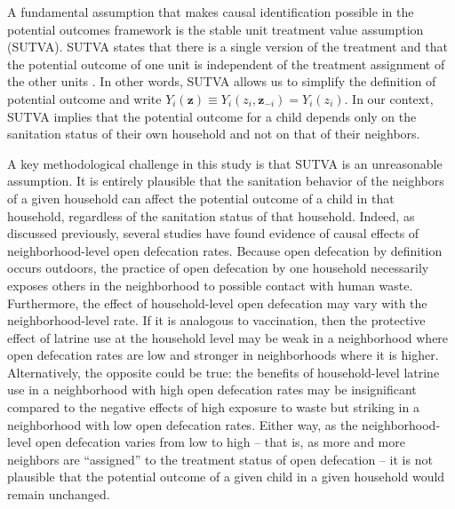 \documentclass[11pt,a4paper]{article}
\begin{document}
A fundamental assumption that makes causal identification possible in the potential outcomes framework is the stable unit treatment value assumption (SUTVA). SUTVA states that there is a single version of the treatment and that the potential outcome of one unit is independent of the treatment assignment of the other units \citep{rubin1986}. In other words, SUTVA allows us to simplify the definition of potential outcome and write $Y_i(\mathbf{z}) \equiv Y_i(z_i, \mathbf{z}_{-i}) = Y_i(z_i)$. In our context, SUTVA implies that the potential outcome for a child depends only on the sanitation status of their own household and not on that of their neighbors.

A key methodological challenge in this study is that SUTVA is an unreasonable assumption. It is entirely plausible that the sanitation behavior of the neighbors of a given household can affect the potential outcome of a child in that household, regardless of the sanitation status of that household. Indeed, as discussed previously, several studies have found evidence of causal effects of neighborhood-level open defecation rates. Because open defecation by definition occurs outdoors, the practice of open defecation by one household necessarily exposes others in the neighborhood to possible contact with human waste. Furthermore, the effect of household-level open defecation may vary with the neighborhood-level rate. If it is analogous to vaccination, then the protective effect of latrine use at the household level may be weak in a neighborhood where open defecation rates are low and stronger in neighborhoods where it is higher. Alternatively, the opposite could be true: the benefits of household-level latrine use in a neighborhood with high open defecation rates may be insignificant compared to the negative effects of high exposure to waste but striking in a neighborhood with low open defecation rates. Either way, as the neighborhood-level open defecation varies from low to high -- that is, as more and more neighbors are ``assigned'' to the treatment status of open defecation -- it is not plausible that the potential outcome of a given child in a given household would remain unchanged.
\end{document}
